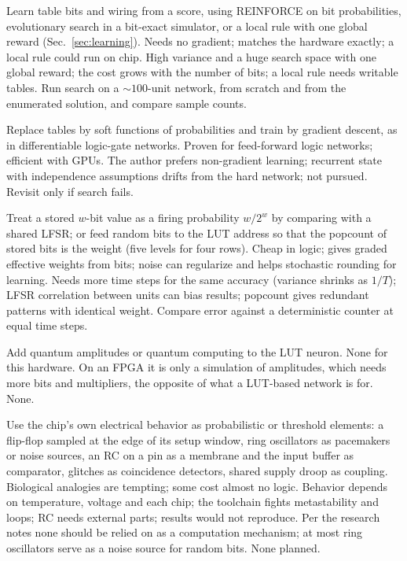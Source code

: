 {Learn table bits and wiring from a score, using REINFORCE on bit probabilities, evolutionary search in a bit-exact simulator, or a local rule with one global reward (Sec.~\ref{sec:learning}).}
{Needs no gradient; matches the hardware exactly; a local rule could run on chip.}
{High variance and a huge search space with one global reward; the cost grows with the number of bits; a local rule needs writable tables.}
{Run search on a ${\sim}100$-unit network, from scratch and from the enumerated solution, and compare sample counts.}

{Replace tables by soft functions of probabilities and train by gradient descent, as in differentiable logic-gate networks.}
{Proven for feed-forward logic networks; efficient with GPUs.}
{The author prefers non-gradient learning; recurrent state with independence assumptions drifts from the hard network; not pursued.}
{Revisit only if search fails.}

{Treat a stored $w$-bit value as a firing probability $w/2^w$ by comparing with a shared LFSR; or feed random bits to the LUT address so that the popcount of stored bits is the weight (five levels for four rows).}
{Cheap in logic; gives graded effective weights from bits; noise can regularize and helps stochastic rounding for learning.}
{Needs more time steps for the same accuracy (variance shrinks as $1/T$); LFSR correlation between units can bias results; popcount gives redundant patterns with identical weight.}
{Compare error against a deterministic counter at equal time steps.}

{Add quantum amplitudes or quantum computing to the LUT neuron.}
{None for this hardware.}
{On an FPGA it is only a simulation of amplitudes, which needs more bits and multipliers, the opposite of what a LUT-based network is for.}
{None.}

{Use the chip's own electrical behavior as probabilistic or threshold elements: a flip-flop sampled at the edge of its setup window, ring oscillators as pacemakers or noise sources, an RC on a pin as a membrane and the input buffer as comparator, glitches as coincidence detectors, shared supply droop as coupling.}
{Biological analogies are tempting; some cost almost no logic.}
{Behavior depends on temperature, voltage and each chip; the toolchain fights metastability and loops; RC needs external parts; results would not reproduce. Per the research notes none should be relied on as a computation mechanism; at most ring oscillators serve as a noise source for random bits.}
{None planned.}


